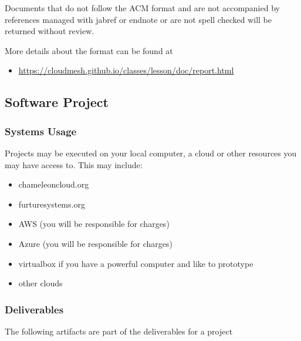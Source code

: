 Documents that do not follow the ACM format and are not accompanied by
references managed with jabref or endnote or are not spell checked will
be returned without review.

More details about the format can be found at

\begin{itemize}
\tightlist
\item
  \url{https://cloudmesh.github.io/classes/lesson/doc/report.html}
\end{itemize}

\subsection{Software Project}\label{software-project}

\subsubsection{Systems Usage}\label{systems-usage}

Projects may be executed on your local computer, a cloud or other
resources you may have access to. This may include:

\begin{itemize}
\tightlist
\item
  chameleoncloud.org
\item
  furturesystems.org
\item
  AWS (you will be responsible for charges)
\item
  Azure (you will be responsible for charges)
\item
  virtualbox if you have a powerful computer and like to prototype
\item
  other clouds
\end{itemize}

\subsubsection{Deliverables}\label{deliverables}

The following artifacts are part of the deliverables for a project

